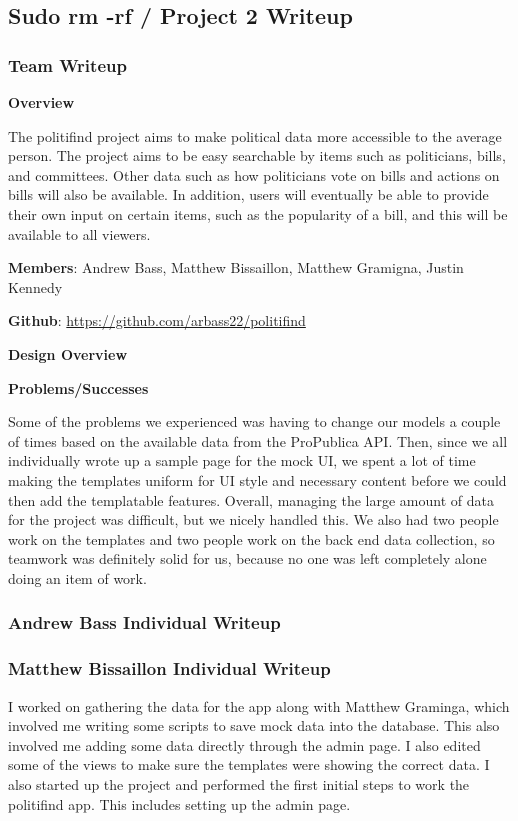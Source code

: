 \documentclass{article}
\newcommand{\n}{\noindent}
\begin{document}
\begin{center}
\subsection*{Sudo rm -rf / Project 2 Writeup}
\end{center}

\subsubsection*{Team Writeup}

\textbf{Overview}

The politifind project aims to make political data more accessible to the average person. The project aims to be easy searchable by items such as politicians, bills, and committees. Other data such as how politicians vote on bills and actions on bills will also be available. In addition, users will eventually be able to provide their own input on certain items, such as the popularity of a bill, and this will be available to all viewers. 

\n\textbf{Members}: Andrew Bass, Matthew Bissaillon, Matthew Gramigna, Justin Kennedy

\n\textbf{Github}: \url{https://github.com/arbass22/politifind}

\n\textbf{Design Overview}

\n\textbf{Problems/Successes}

Some of the problems we experienced was having to change our models a couple of times based on the available data from the ProPublica API. Then, since we all individually wrote up a sample page for the mock UI, we spent a lot of time making the templates uniform for UI style and necessary content before we could then add the templatable features. Overall, managing the large amount of data for the project was difficult, but we nicely handled this. We also had two people work on the templates and two people work on the back end data collection, so teamwork was definitely solid for us, because no one was left completely alone doing an item of work.

\pagebreak

\subsubsection*{Andrew Bass Individual Writeup}

\pagebreak

\subsubsection*{Matthew Bissaillon Individual Writeup}
I worked on gathering the data for the app along with Matthew Graminga, which involved me writing some scripts to save mock data into the database. This also involved me adding some data directly through the admin page. I also edited some of the views to make sure the templates were showing the correct data. I also started up the project and performed the first initial steps to work the politifind app. This includes setting up the admin page. \\
\end{document}
